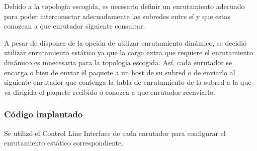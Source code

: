 Debido a la topología escogida, es necesario definir un enrutamiento
adecuado para poder interconectar adecuadamente las subredes entre sí y
que estas conozcan a que enrutador siguiente consultar.

A pesar de disponer de la opción de utilizar enrutamiento dinámico, se
decidió utilizar enrutamiento estático ya que la carga extra que
requiere el enrutamiento dinámico es innecesaria para la topología
escogida. Así, cada enrutador se encarga o bien de enviar el paquete a
un host de su subred o de enviarlo al siguiente enrutador que contenga
la tabla de enrutamiento de la subred a la que va dirigida el paquete
recibido o conozca a que enrutador reenviarlo.

\subsubsection{Código implantado}\label{cuxf3digo-implantado}

Se utilizó el Control Line Interface de cada enrutador para configurar
el enrutamiento estático correspondiente.

